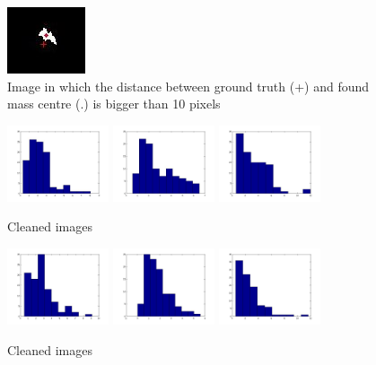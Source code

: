 \documentclass[10pt,a4paper,oneclumn]{article}
\begin{document}
\begin{figure}[h!]
\centering
  \includegraphics{errorCroped.jpg}
\caption{Image in which the distance between ground truth (+) and found mass centre (.) is bigger than 10 pixels}
\end{figure}

\begin{figure}[h!]
\centering
  \includegraphics[width=3cm]{redHist.jpg}
  \includegraphics[width=3cm]{greenHist.jpg}
  \includegraphics[width=3cm]{yellowHist.jpg}
\caption{Cleaned images}
\end{figure}

\begin{figure}[h!]
\centering
  \includegraphics[width=3cm]{redHistBound.jpg}
  \includegraphics[width=3cm]{greenHistBound.jpg}
  \includegraphics[width=3cm]{yellowHistBound.jpg}
\caption{Cleaned images}
\end{figure}
\end{document}
